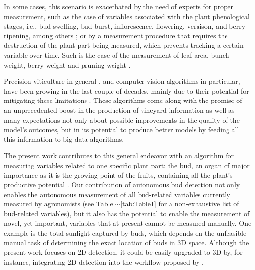 \documentclass[a4paper,authoryear,review]{elsarticle}
\begin{document}
	In some cases, this scenario is exacerbated by the need of experts for proper measurement, such as the case of variables associated with the plant phenological stages, i.e.,  bud swelling, bud burst, inflorescence, flowering, veraison, and berry ripening, among others \citep{lorenz1995growth}; or by a measurement procedure that requires the destruction of the plant part being measured, which prevents tracking a certain variable over time. Such is the case of the measurement of leaf area, bunch weight, berry weight and pruning weight \citep{kliewer2005leaf}. 
	
	Precision viticulture in general \citep{bramley2009lessons}, and computer vision algorithms in particular, have been growing in the last couple of decades, mainly due to their potential for mitigating these limitations \citep{seng2018computer, matese2015technology}. These algorithms come along with the promise of an unprecedented boost in the production of vineyard information as well as many expectations not only about possible improvements in the quality of the model’s outcomes, but in its potential to produce better models by feeding all this information to big data algorithms. 
	
	The present work contributes to this general endeavor with an algorithm for measuring variables related to one specific plant part: the bud, an organ of major importance as it is the growing point of the fruits, containing all the plant’s productive potential \citep{may2000bud}. Our contribution of autonomous bud detection not only enables the autonomous measurement of all bud-related variables currently measured by agronomists (see Table $\sim$\ref{tab:Table1} for a non-exhaustive list of bud-related variables), but it also has the potential to enable the measurement of novel, yet important, variables that at present cannot be measured manually. One example is the total sunlight captured by buds, which depends on the unfeasible manual task of determining the exact location of buds in 3D space.  Although the present work focuses on 2D detection, it could be easily upgraded to 3D by, for instance, integrating 2D detection into the workflow proposed by \citet{diaz2018grapevine} .
	
\end{document}
